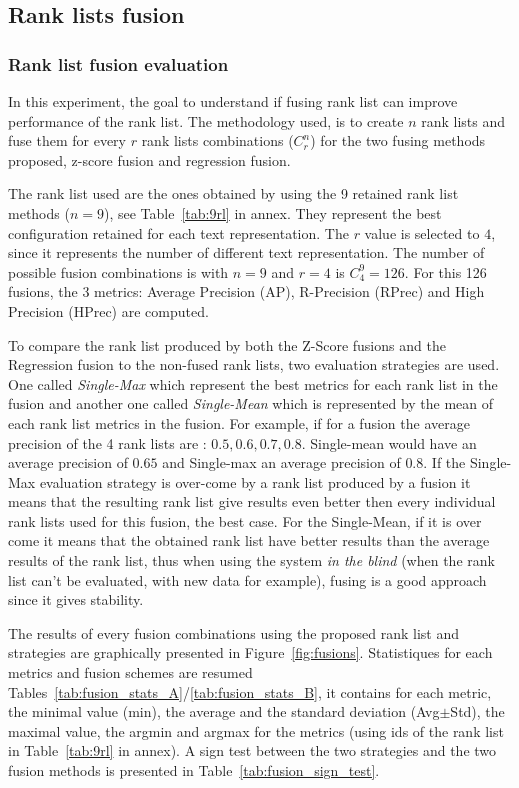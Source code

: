 \subsection{Rank lists fusion}

\subsubsection{Rank list fusion evaluation \label{sec:eval_fusion}}

In this experiment, the goal to understand if fusing rank list can improve performance of the rank list.
The methodology used, is to create $n$ rank lists and fuse them for every $r$ rank lists combinations ($C^n_r$) for the two fusing methods proposed, z-score fusion and regression fusion.

The rank list used are the ones obtained by using the 9 retained rank list methods ($n=9$), see Table~\ref{tab:9rl} in annex.
They represent the best configuration retained for each text representation.
The $r$ value is selected to $4$, since it represents the number of different text representation.
The number of possible fusion combinations is with $n=9$ and $r=4$ is $C^{9}_{4} = 126$.
For this 126 fusions, the 3 metrics: Average Precision (AP), R-Precision (RPrec) and High Precision (HPrec) are computed.

To compare the rank list produced by both the Z-Score fusions and the Regression fusion to the non-fused rank lists, two evaluation strategies are used.
One called \textit{Single-Max} which represent the best metrics for each rank list in the fusion and another one called \textit{Single-Mean} which is represented by the mean of each rank list metrics in the fusion.
For example, if for a fusion the average precision of the 4 rank lists are : $0.5, 0.6, 0.7, 0.8$. Single-mean would have an average precision of $0.65$ and Single-max an average precision of $0.8$.
If the Single-Max evaluation strategy is over-come by a rank list produced by a fusion it means that the resulting rank list give results even better then every individual rank lists used for this fusion, the best case.
For the Single-Mean, if it is over come it means that the obtained rank list have better results than the average results of the rank list, thus when using the system \textit{in the blind} (when the rank list can't be evaluated, with new data for example), fusing is a good approach since it gives stability.

The results of every fusion combinations using the proposed rank list and strategies are graphically presented in Figure~\ref{fig:fusions}.
Statistiques for each metrics and fusion schemes are resumed Tables~\ref{tab:fusion_stats_A}/\ref{tab:fusion_stats_B}, it contains for each metric, the minimal value (min), the average and the standard deviation (Avg$\pm$Std), the maximal value, the argmin and argmax for the metrics (using ids of the rank list in Table~\ref{tab:9rl} in annex).
A sign test between the two strategies and the two fusion methods is presented in Table~\ref{tab:fusion_sign_test}.

